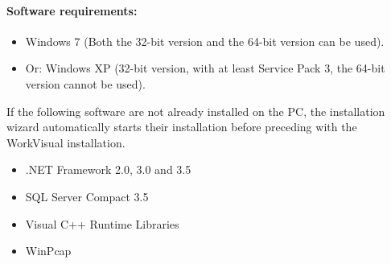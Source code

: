 	\paragraph{Software requirements:}
		\begin{itemize}
			\item Windows 7 (Both the 32-bit version and the 64-bit version can be used).
			\item Or: Windows XP (32-bit version, with at least Service Pack 3, the 64-bit version cannot be used).
		\end{itemize}
	If the following software are not already installed on the PC, the installation wizard automatically starts their installation before preceding with the WorkVisual installation.
		\begin{itemize}
			\item .NET Framework 2.0, 3.0 and 3.5
			\item SQL Server Compact 3.5
			\item Visual C++ Runtime Libraries
			\item WinPcap
		\end{itemize}
